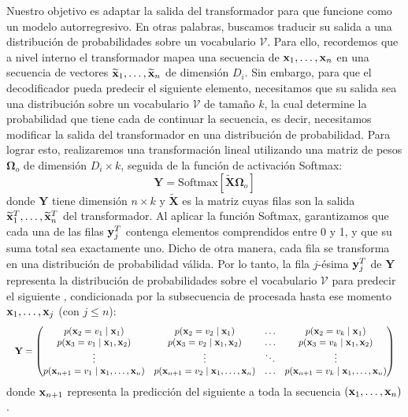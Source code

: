 Nuestro objetivo es adaptar la salida del transformador para que 
funcione como un modelo autorregresivo. En otras palabras, buscamos traducir 
su salida a una distribución de probabilidades sobre un 
vocabulario $\mathcal{V}$. 
Para ello, recordemos que a nivel interno el transformador mapea una secuencia 
de \tokens{} $\mathbf{x}_1, \dots, \mathbf{x}_n$ en una secuencia de  vectores 
$\widetilde{\mathbf{x}}_1, \dots, \widetilde{\mathbf{x}}_n$ de dimensión $D_i$. Sin embargo, 
para que el decodificador pueda predecir el siguiente elemento, necesitamos que 
su salida sea una distribución sobre un vocabulario $\mathcal{V}$ de tamaño $k$, 
la cual determine la probabilidad que tiene cada \token{} de continuar la 
secuencia, es decir, necesitamos modificar la salida del transformador  en una
distribución de probabilidad. 
Para lograr esto, realizaremos una transformación lineal utilizando una matriz de 
pesos $\mathbf{\Omega}_o$ de 
dimensión $D_i \times k$, seguida de la función de activación Softmax:
\begin{equation}
    \mathbf{Y} = \text{Softmax}[\widetilde{\mathbf{X}}\mathbf{\Omega}_o]
\end{equation}
donde $\mathbf{Y}$ tiene dimensión $n \times k$ y $\widetilde{\mathbf{X}}$ es 
la matriz cuyas filas son la salida $\widetilde{\mathbf{x}}_1^T, \dots, \widetilde{\mathbf{x}}_n^T$
del transformador. 
Al aplicar la función Softmax, garantizamos que cada una de las filas $\mathbf{y}_j^T$ 
contenga elementos comprendidos entre 0 y 1, y que su suma total sea 
exactamente uno. Dicho de otra manera, cada fila se transforma en una distribución 
de probabilidad válida. 
Por lo tanto, la fila $j$-ésima $\mathbf{y}_j^T$ de $\mathbf{Y}$ representa la 
distribución de probabilidades sobre el vocabulario $\mathcal{V}$ para predecir 
el siguiente \token{}, condicionada por la subsecuencia de 
\tokens{} procesada hasta ese momento $\mathbf{x}_1, \dots, \mathbf{x}_j$ (con $j \leq n$):
\begin{equation*}
\resizebox{\textwidth}{!}{%
$\mathbf{Y} =
\begin{pmatrix}
p(\x_2 = v_1 \mid \x_1) & p(\x_2 = v_2 \mid \x_1) & \dots & p(\x_2 = v_k \mid \x_1) \\
p(\x_3 = v_1 \mid \x_1, \x_2) & p(\x_3 = v_2 \mid \x_1, \x_2) & \dots & p(\x_3 = v_k \mid \x_1, \x_2) \\
\vdots & \vdots & \ddots & \vdots \\
p(\x_{n+1} = v_1 \mid \x_1, \dots, \x_n) & p(\x_{n+1} = v_2 \mid \x_1, \dots, \x_n) & \dots & p(\x_{n+1} = v_k \mid \x_1, \dots, \x_n)
\end{pmatrix}$%
}
\end{equation*}
donde $\mathbf{x}_{n+1}$ representa la predicción del siguiente \token a toda la secuencia 
$(\mathbf{x}_1, \dots, \mathbf{x}_n)$.

